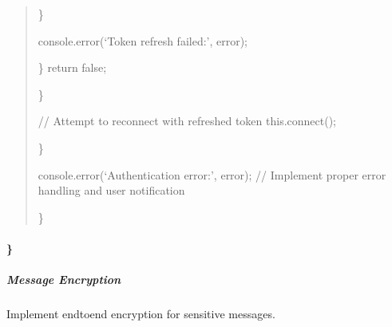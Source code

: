 \documentclass[letterpaper,10pt,english]{sphinxmanual}
\begin{document}
\begin{quote}
\begin{description}
\begin{description}
\begin{description}
\end{description}

\sphinxAtStartPar
\}

\sphinxAtStartPar
console.error(‘Token refresh failed:’, error);

\end{description}

\sphinxAtStartPar
\}
return false;

\end{description}

\sphinxAtStartPar
\}
\begin{description}
\sphinxAtStartPar
// Attempt to reconnect with refreshed token
this.connect();

\end{description}

\sphinxAtStartPar
\}
\begin{description}
\sphinxAtStartPar
console.error(‘Authentication error:’, error);
// Implement proper error handling and user notification

\end{description}

\sphinxAtStartPar
\}
\end{quote}


\paragraph{\}}
\label{\detokenize{api/websocket-api:id145}}

\subparagraph{Message Encryption}
\label{\detokenize{api/websocket-api:message-encryption}}
\sphinxAtStartPar
Implement end\sphinxhyphen{}to\sphinxhyphen{}end encryption for sensitive messages.
\end{document}
